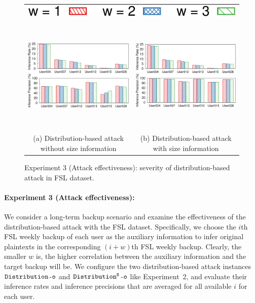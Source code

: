 \documentclass[bachelor]{thesis-uestc}
\begin{document}
\begin{figure}[t]
     \centering
    \centering
    \begin{tabular}{c@{\hskip 2em}c}
        \multicolumn{2}{c}{\includegraphics[width=.25\textwidth]{pic/legend-effectiveness.pdf}} \smallskip \\
        \includegraphics[height=2.2in]{pic/distribution-effectiveness-wo-size.pdf} &
	\includegraphics[height=2.2in]{pic/distribution-effectiveness-w-size.pdf} \medskip \\
        {\footnotesize 
        (a) Distribution-based attack without size information  
        } &
        {\footnotesize
        (b) Distribution-based attack with size information 
        } \\
    \end{tabular}
	\caption{Experiment 3 (Attack effectiveness): severity of distribution-based attack in FSL dataset.}
	\label{fig:experiment-distribution-effectiveness}
\end{figure}


\paragraph{Experiment 3 (Attack effectiveness):} We consider a long-term
backup scenario and examine the effectiveness of the distribution-based attack
with the FSL dataset. Specifically, we choose the $i$th FSL weekly backup of
each user as the auxiliary information to infer original plaintexts in the corresponding $(i+w)$th FSL
weekly backup. Clearly, the smaller $w$ is, the higher correlation between the
auxiliary information and the target backup will be.  We configure the two  
distribution-based attack instances $\tt Distribution$-$\tt o$ and $\tt Distribution^S$-$\tt o$
like Experiment~2, and evaluate their inference rates and inference precisions that
are averaged for all available $i$ for each user. 
\end{document}
